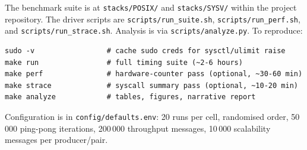 \documentclass[a4paper,11pt]{article}
\begin{document}
The benchmark suite is at \texttt{stacks/POSIX/} and \texttt{stacks/SYSV/}
within the project repository. The driver scripts are
\texttt{scripts/run\_suite.sh}, \texttt{scripts/run\_perf.sh}, and
\texttt{scripts/run\_strace.sh}. Analysis is via
\texttt{scripts/analyze.py}. To reproduce:

\begin{verbatim}
sudo -v                 # cache sudo creds for sysctl/ulimit raise
make run                # full timing suite (~2-6 hours)
make perf               # hardware-counter pass (optional, ~30-60 min)
make strace             # syscall summary pass (optional, ~10-20 min)
make analyze            # tables, figures, narrative report
\end{verbatim}

Configuration is in \texttt{config/defaults.env}: 20 runs per cell,
randomised order, 50\,000 ping-pong iterations, 200\,000 throughput
messages, 10\,000 scalability messages per producer/pair.
\end{document}
